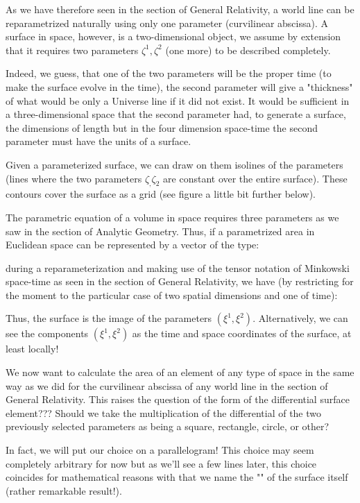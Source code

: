 	As we have therefore seen in the section of General Relativity, a world line can be reparametrized naturally using only one parameter (curvilinear abscissa). A surface in space, however, is a two-dimensional object, we assume by extension that it requires two parameters $\zeta^1,\zeta^2$ (one more) to be described completely.
	
	Indeed, we guess, that one of the two parameters will be the proper time (to make the surface evolve in the time), the second parameter will give a "thickness" of what would be only a Universe line if it did not exist. It would be sufficient in a three-dimensional space that the second parameter had, to generate a surface, the dimensions of length but in the four dimension space-time the second parameter must have the units of a surface.
	
	Given a parameterized surface, we can draw on them isolines of the parameters (lines where the two parameters $\zeta_,\zeta_2$ are constant over the entire surface). These contours cover the surface as a grid (see figure a little bit further below).
	
	The parametric equation of a volume in space requires three parameters as we saw in the section of Analytic Geometry. Thus, if a parametrized area in Euclidean space can be represented by a vector of the type:
	
	during a reparameterization and making use of the tensor notation of Minkowski space-time as seen in the section of General Relativity, we have (by restricting for the moment to the particular case of two spatial dimensions and one of time):
	
	Thus, the surface is the image of the parameters $(\xi^1,\xi^2)$. Alternatively, we can see the components $(\xi^1,\xi^2)$ as the time and space coordinates of the surface, at least locally!
	
	We now want to calculate the area of an element of any type of space in the same way as we did for the curvilinear abscissa of any world line in the section of General Relativity. This raises the question of the form of the differential surface element??? Should we take the multiplication of the differential of the two previously selected parameters as being a square, rectangle, circle, or other?
	
	In fact, we will put our choice on a parallelogram! This choice may seem completely arbitrary for now but as we'll see a few lines later, this choice coincides for mathematical reasons with that we name the "" of the surface itself (rather remarkable result!).
	
